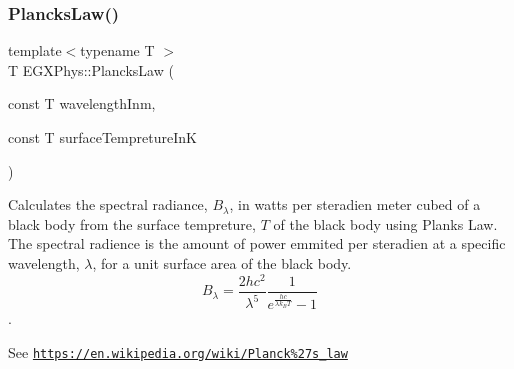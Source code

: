 \subsubsection{\texorpdfstring{Plancks\+Law()}{PlancksLaw()}}
{\footnotesize\ttfamily template$<$typename T $>$ \\
T E\+G\+X\+Phys\+::\+Plancks\+Law (\begin{DoxyParamCaption}\item[{const T}]{wavelength\+Inm,  }\item[{const T}]{surface\+Tempreture\+InK }\end{DoxyParamCaption})}



Calculates the spectral radiance, $B_{\lambda}$, in watts per steradien meter cubed of a black body from the surface tempreture, $T$ of the black body using Plank\textquotesingle{}s Law. The spectral radience is the amount of power emmited per steradien at a specific wavelength, $\lambda$, for a unit surface area of the black body. \[ B_{\lambda} = \dfrac{2 h c^2}{\lambda^5} \dfrac{1}{e^{\frac{hc}{\lambda k_B T}} - 1} \]. 

See \href{https://en.wikipedia.org/wiki/Planck%27s_law}{\tt https\+://en.\+wikipedia.\+org/wiki/\+Planck\%27s\+\_\+law}


